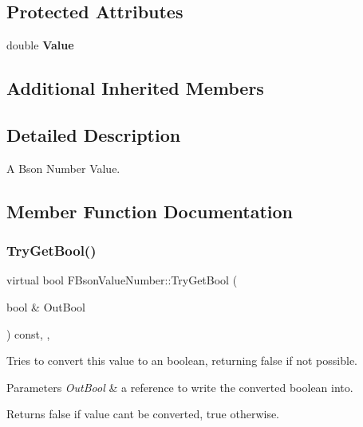 \subsection*{Protected Attributes}
\begin{DoxyCompactItemize}
\item 
\mbox{\label{class_f_bson_value_number_a37e55c82055b7e09df5ff477013b5b5c}} 
double {\bfseries Value}
\end{DoxyCompactItemize}
\subsection*{Additional Inherited Members}


\subsection{Detailed Description}
A Bson Number Value. 

\subsection{Member Function Documentation}
\mbox{\label{class_f_bson_value_number_af85e6c473afae0cb5340499ab013cf4f}} 
\subsubsection{\texorpdfstring{Try\+Get\+Bool()}{TryGetBool()}}
{\footnotesize\ttfamily virtual bool F\+Bson\+Value\+Number\+::\+Try\+Get\+Bool (\begin{DoxyParamCaption}\item[{bool \&}]{Out\+Bool }\end{DoxyParamCaption}) const\hspace{0.3cm}{\ttfamily [inline]}, {\ttfamily [override]}, {\ttfamily [virtual]}}

Tries to convert this value to an boolean, returning false if not possible.


\begin{DoxyParams}{Parameters}
{\em Out\+Bool} & a reference to write the converted boolean into. \\
\hline
\end{DoxyParams}
\begin{DoxyReturn}{Returns}
false if value can\textquotesingle{}t be converted, true otherwise. 
\end{DoxyReturn}


